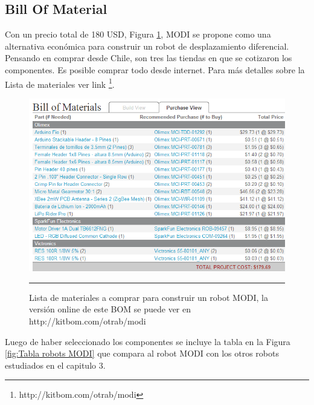 
\subsection{Bill Of Material}

Con un precio total de 180 USD, Figura \ref{fig:BOM}, MODI se propone como una alternativa económica para construir un robot de desplazamiento diferencial. Pensando en comprar desde Chile, son tres las tiendas en que se cotizaron los componentes. Es posible comprar todo desde internet. Para más detalles sobre la Lista de materiales ver link \footnote{http://kitbom.com/otrab/modi}.
\begin{figure}[htbp]
	\centering
		\includegraphics[width=\textwidth]{./Figures/MODI/kitbom.png}
		\rule{35em}{0.5pt}
	\caption[Bill Of Materials]{Lista de materiales a comprar para construir un robot MODI, la versión online de este BOM se puede ver en http://kitbom.com/otrab/modi}
	\label{fig:BOM}
\end{figure}

Luego de haber seleccionado los componentes se incluye la tabla en la Figura \ref{fig:Tabla robots MODI} que compara al robot MODI con los otros robots estudiados en el capitulo 3.

